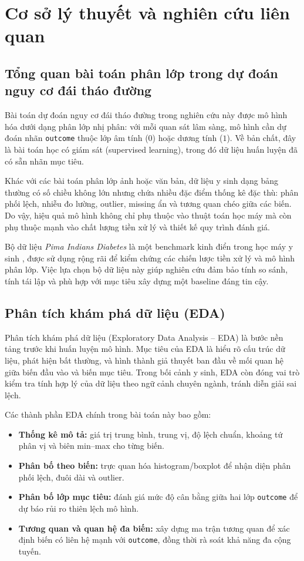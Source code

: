 \chapter{Cơ sở lý thuyết và nghiên cứu liên quan}

\section{Tổng quan bài toán phân lớp trong dự đoán nguy cơ đái tháo đường}
Bài toán dự đoán nguy cơ đái tháo đường trong nghiên cứu này được mô hình hóa dưới dạng phân lớp nhị phân:
với mỗi quan sát lâm sàng, mô hình cần dự đoán nhãn \texttt{outcome} thuộc lớp âm tính (\(0\)) hoặc dương tính (\(1\)).
Về bản chất, đây là bài toán học có giám sát (supervised learning), trong đó dữ liệu huấn luyện đã có sẵn nhãn mục tiêu.

Khác với các bài toán phân lớp ảnh hoặc văn bản, dữ liệu y sinh dạng bảng thường có số chiều không lớn nhưng chứa nhiều đặc điểm
thống kê đặc thù: phân phối lệch, nhiễu đo lường, outlier, missing ẩn và tương quan chéo giữa các biến. Do vậy, hiệu quả mô hình
không chỉ phụ thuộc vào thuật toán học máy mà còn phụ thuộc mạnh vào chất lượng tiền xử lý và thiết kế quy trình đánh giá.

Bộ dữ liệu \textit{Pima Indians Diabetes} là một benchmark kinh điển trong học máy y sinh \cite{pima_uci,smith1988adap},
được sử dụng rộng rãi để kiểm chứng các chiến lược tiền xử lý và mô hình phân lớp. Việc lựa chọn bộ dữ liệu này giúp nghiên cứu
đảm bảo tính so sánh, tính tái lập và phù hợp với mục tiêu xây dựng một baseline đáng tin cậy.

\section{Phân tích khám phá dữ liệu (EDA)}
Phân tích khám phá dữ liệu (Exploratory Data Analysis -- EDA) là bước nền tảng trước khi huấn luyện mô hình. Mục tiêu của EDA
là hiểu rõ cấu trúc dữ liệu, phát hiện bất thường, và hình thành giả thuyết ban đầu về mối quan hệ giữa biến đầu vào và biến mục tiêu.
Trong bối cảnh y sinh, EDA còn đóng vai trò kiểm tra tính hợp lý của dữ liệu theo ngữ cảnh chuyên ngành, tránh diễn giải sai lệch.

Các thành phần EDA chính trong bài toán này bao gồm:
\begin{itemize}[leftmargin=1.5em]
    \item \textbf{Thống kê mô tả:} giá trị trung bình, trung vị, độ lệch chuẩn, khoảng tứ phân vị và biên min--max cho từng biến.
    \item \textbf{Phân bố theo biến:} trực quan hóa histogram/boxplot để nhận diện phân phối lệch, đuôi dài và outlier.
    \item \textbf{Phân bố lớp mục tiêu:} đánh giá mức độ cân bằng giữa hai lớp \texttt{outcome} để dự báo rủi ro thiên lệch mô hình.
    \item \textbf{Tương quan và quan hệ đa biến:} xây dựng ma trận tương quan để xác định biến có liên hệ mạnh với \texttt{outcome},
    đồng thời rà soát khả năng đa cộng tuyến.
\end{itemize}

